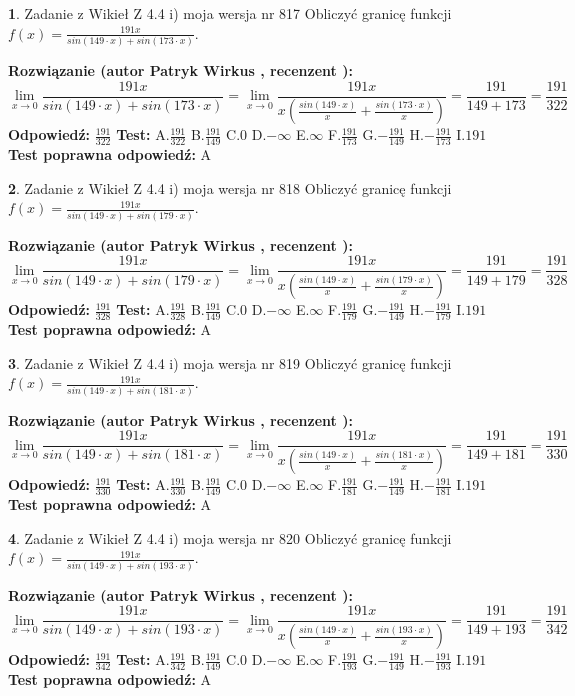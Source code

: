 \documentclass[12pt, a4paper]{article}
\theoremstyle{definition} %
\newtheorem{zad}{}
\newcommand{\zadStart}[1]{\begin{zad}#1\newline}
\newcommand{\zadStop}{\end{zad}}
\newcommand{\rozwStart}[2]{\noindent \textbf{Rozwiązanie (autor #1 , recenzent #2): }\newline}
\newcommand{\rozwStop}{\newline}
\newcommand{\odpStart}{\noindent \textbf{Odpowiedź:}\newline}
\newcommand{\odpStop}{\newline}
\newcommand{\testStart}{\noindent \textbf{Test:}\newline}
\newcommand{\testStop}{\newline}
\newcommand{\kluczStart}{\noindent \textbf{Test poprawna odpowiedź:}\newline}
\newcommand{\kluczStop}{\newline}
\begin{document}
\zadStart{Zadanie z Wikieł Z 4.4 i) moja wersja nr 817}
Obliczyć granicę funkcji $f(x)=\frac{191x}{sin(149\cdot x) +sin(173\cdot x)}$.
\zadStop
\rozwStart{Patryk Wirkus}{}
$$\lim\limits_{x\to 0}\frac{191x}{sin(149\cdot x) +sin(173\cdot x)}=\lim\limits_{x\to 0}\frac{191x}{x(\frac{sin(149\cdot x)}{x}+\frac{sin(173\cdot x)}{x})}=\frac{191}{149+173} = \frac{191}{322}$$
\rozwStop
\odpStart
$\frac{191}{322}$
\odpStop
\testStart
A.$\frac{191}{322}$
B.$\frac{191}{149}$
C.$0$
D.$-\infty$
E.$\infty$
F.$\frac{191}{173}$
G.$-\frac{191}{149}$
H.$-\frac{191}{173}$
I.$191$
\testStop
\kluczStart
A
\kluczStop



\zadStart{Zadanie z Wikieł Z 4.4 i) moja wersja nr 818}
Obliczyć granicę funkcji $f(x)=\frac{191x}{sin(149\cdot x) +sin(179\cdot x)}$.
\zadStop
\rozwStart{Patryk Wirkus}{}
$$\lim\limits_{x\to 0}\frac{191x}{sin(149\cdot x) +sin(179\cdot x)}=\lim\limits_{x\to 0}\frac{191x}{x(\frac{sin(149\cdot x)}{x}+\frac{sin(179\cdot x)}{x})}=\frac{191}{149+179} = \frac{191}{328}$$
\rozwStop
\odpStart
$\frac{191}{328}$
\odpStop
\testStart
A.$\frac{191}{328}$
B.$\frac{191}{149}$
C.$0$
D.$-\infty$
E.$\infty$
F.$\frac{191}{179}$
G.$-\frac{191}{149}$
H.$-\frac{191}{179}$
I.$191$
\testStop
\kluczStart
A
\kluczStop



\zadStart{Zadanie z Wikieł Z 4.4 i) moja wersja nr 819}
Obliczyć granicę funkcji $f(x)=\frac{191x}{sin(149\cdot x) +sin(181\cdot x)}$.
\zadStop
\rozwStart{Patryk Wirkus}{}
$$\lim\limits_{x\to 0}\frac{191x}{sin(149\cdot x) +sin(181\cdot x)}=\lim\limits_{x\to 0}\frac{191x}{x(\frac{sin(149\cdot x)}{x}+\frac{sin(181\cdot x)}{x})}=\frac{191}{149+181} = \frac{191}{330}$$
\rozwStop
\odpStart
$\frac{191}{330}$
\odpStop
\testStart
A.$\frac{191}{330}$
B.$\frac{191}{149}$
C.$0$
D.$-\infty$
E.$\infty$
F.$\frac{191}{181}$
G.$-\frac{191}{149}$
H.$-\frac{191}{181}$
I.$191$
\testStop
\kluczStart
A
\kluczStop



\zadStart{Zadanie z Wikieł Z 4.4 i) moja wersja nr 820}
Obliczyć granicę funkcji $f(x)=\frac{191x}{sin(149\cdot x) +sin(193\cdot x)}$.
\zadStop
\rozwStart{Patryk Wirkus}{}
$$\lim\limits_{x\to 0}\frac{191x}{sin(149\cdot x) +sin(193\cdot x)}=\lim\limits_{x\to 0}\frac{191x}{x(\frac{sin(149\cdot x)}{x}+\frac{sin(193\cdot x)}{x})}=\frac{191}{149+193} = \frac{191}{342}$$
\rozwStop
\odpStart
$\frac{191}{342}$
\odpStop
\testStart
A.$\frac{191}{342}$
B.$\frac{191}{149}$
C.$0$
D.$-\infty$
E.$\infty$
F.$\frac{191}{193}$
G.$-\frac{191}{149}$
H.$-\frac{191}{193}$
I.$191$
\testStop
\kluczStart
A
\kluczStop
\end{document}
